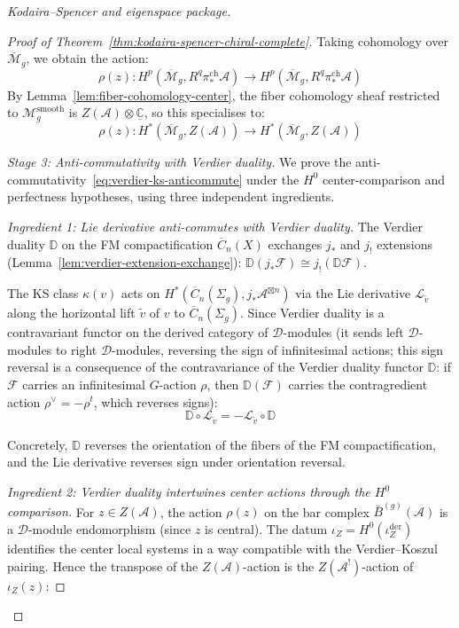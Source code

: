 \begin{proof}[Kodaira--Spencer and eigenspace package]
\begin{proof}[Proof of Theorem~\ref{thm:kodaira-spencer-chiral-complete}]
Taking cohomology over $\overline{\mathcal{M}}_g$, we obtain the action:
\begin{equation}
\rho(z): H^p(\overline{\mathcal{M}}_g, R^q\pi_*^{\mathrm{ch}}\mathcal{A}) \to
H^p(\overline{\mathcal{M}}_g, R^q\pi_*^{\mathrm{ch}}\mathcal{A})
\end{equation}
By Lemma~\ref{lem:fiber-cohomology-center}, the fiber cohomology sheaf restricted to
$\mathcal{M}_g^{\mathrm{smooth}}$ is $Z(\mathcal{A}) \otimes \underline{\mathbb{C}}$,
so this specialises to:
\begin{equation}
\rho(z): H^*(\overline{\mathcal{M}}_g, Z(\mathcal{A})) \to
H^*(\overline{\mathcal{M}}_g, Z(\mathcal{A}))
\end{equation}

\emph{Stage 3: Anti-commutativity with Verdier duality.}
We prove the anti-commutativity~\eqref{eq:verdier-ks-anticommute} under the
$H^0$ center-comparison and perfectness hypotheses, using three independent ingredients.

\emph{Ingredient 1: Lie derivative anti-commutes with Verdier duality.}
The Verdier duality $\mathbb{D}$ on the FM compactification $\overline{C}_n(X)$
exchanges $j_*$ and $j_!$ extensions (Lemma~\ref{lem:verdier-extension-exchange}):
$\mathbb{D}(j_* \mathcal{F}) \cong j_!(\mathbb{D}\mathcal{F})$.

The KS class $\kappa(v)$ acts on $H^*(\overline{C}_n(\Sigma_g), j_*\mathcal{A}^{\boxtimes n})$
via the Lie derivative $\mathcal{L}_{\tilde{v}}$ along the horizontal lift $\tilde{v}$
of $v$ to $\overline{C}_n(\Sigma_g)$. Since Verdier duality is a contravariant functor
on the derived category of $\mathcal{D}$-modules (it sends left $\mathcal{D}$-modules
to right $\mathcal{D}$-modules, reversing the sign of infinitesimal actions; this
sign reversal is a consequence of the contravariance of the Verdier duality functor
$\mathbb{D}$: if $\mathcal{F}$ carries an infinitesimal $G$-action $\rho$, then
$\mathbb{D}(\mathcal{F})$ carries the contragredient action
$\rho^\vee = -\rho^t$, which reverses signs):
\begin{equation}\label{eq:verdier-lie-anticommute}
\mathbb{D} \circ \mathcal{L}_{\tilde{v}} = -\mathcal{L}_{\tilde{v}} \circ \mathbb{D}
\end{equation}

Concretely, $\mathbb{D}$ reverses the orientation of the fibers of the FM
compactification, and the Lie derivative reverses sign under orientation reversal.

\emph{Ingredient 2: Verdier duality intertwines center actions through the \(H^0\) comparison.}
For $z \in Z(\mathcal{A})$, the action $\rho(z)$ on the bar complex
$\bar{B}^{(g)}(\mathcal{A})$ is a $\mathcal{D}$-module endomorphism (since $z$ is
central). The datum $\iota_Z=H^0(\iota_Z^{\mathrm{der}})$ identifies the
center local systems in a way compatible with the Verdier--Koszul pairing.
Hence the transpose of the $Z(\mathcal{A})$-action is the
$Z(\mathcal{A}^!)$-action of $\iota_Z(z)$:


\end{proof}
\end{proof}
